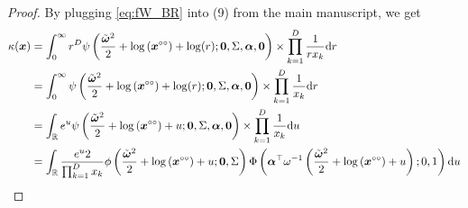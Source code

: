 \documentclass[12pt]{article}
\begin{document}
\begin{proof}
By plugging \eqref{eq:fW_BR} into (9) from the main manuscript, we get
%
\begin{align*}
\kappa(\bm x) &= \int_0^\infty r^D \psi\left( \frac{\tilde{\bm \omega}^2}{2} + \log\left(\bm x^{\circ\circ}\right) + \log(r); \bm 0, \Sigma, \bm \alpha, \bm 0\right) \times \prod_{k=1}^D \frac{1}{r x_k} \text dr \\
&= \int_0^\infty \psi\left( \frac{\tilde{\bm \omega}^2}{2} + \log\left(\bm x^{\circ\circ}\right) + \log(r); \bm 0, \Sigma, \bm \alpha, \bm 0\right) \times \prod_{k=1}^D \frac{1}{x_k} \text dr \\
&= \int_{\mathbb{R}} e^{u} \psi\left( \frac{\tilde{\bm \omega}^2}{2} + \log\left(\bm x^{\circ\circ}\right) + u; \bm 0, \Sigma, \bm \alpha, \bm 0\right) \times \prod_{k=1}^D \frac{1}{x_k} \text du \\
&= \int_{\mathbb{R}} \frac{e^{u} 2}{\prod_{k=1}^D x_k} \phi\left( \frac{\tilde{\bm \omega}^2}{2} + \log\left(\bm x^{\circ\circ}\right) + u; \bm 0, \Sigma\right) \Phi\left( \bm \alpha^\top \omega^{-1} \left( \frac{\tilde{\bm \omega}^2}{2} + \log\left(\bm x^{\circ\circ}\right) + u \right); 0, 1\right) \text du \\
\end{align*}


\end{proof}
\end{document}
